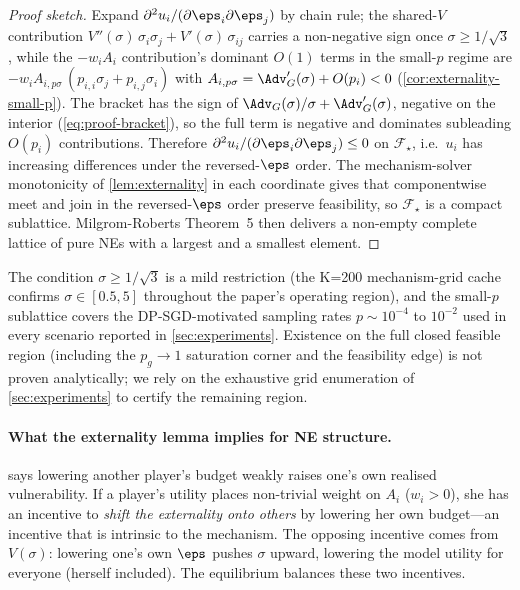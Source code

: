 \begin{proof}[Proof sketch]
Expand $\partial^2 u_i / (\partial \eps_i \partial \eps_j)$ by chain
rule; the shared-$V$ contribution
$V''(\sigma)\,\sigma_i\sigma_j + V'(\sigma)\,\sigma_{ij}$ carries a
non-negative sign once $\sigma \geq 1/\sqrt 3$, while the $-w_i A_i$
contribution's dominant $O(1)$ terms in the small-$p$ regime are
$-w_i A_{i,p\sigma}\,(p_{i,i}\sigma_j + p_{i,j}\sigma_i)$ with
$A_{i,p\sigma} = \Adv_G'(\sigma) + O(p_i) < 0$
(\cref{cor:externality-small-p}). The bracket has the sign of
$\Adv_G(\sigma)/\sigma + \Adv_G'(\sigma)$, negative on the interior
(\eqref{eq:proof-bracket}), so the full term is negative and dominates
subleading $O(p_i)$ contributions. Therefore
$\partial^2 u_i / (\partial \eps_i \partial \eps_j) \leq 0$ on
$\mathcal F_\star$, i.e.\ $u_i$ has increasing differences under the
reversed-$\eps$ order. The mechanism-solver monotonicity of \cref{lem:externality}
in each coordinate gives that componentwise meet and join in the
reversed-$\eps$ order preserve feasibility, so $\mathcal F_\star$ is a
compact sublattice. Milgrom-Roberts Theorem~5
\cite{milgrom1990rationalizability} then delivers a non-empty complete
lattice of pure NEs with a largest and a smallest element.
\end{proof}

The condition $\sigma \geq 1/\sqrt 3$ is a mild restriction (the K=200
mechanism-grid cache confirms $\sigma \in [0.5, 5]$ throughout the
paper's operating region), and the small-$p$ sublattice covers the
DP-SGD-motivated sampling rates $p \sim 10^{-4}$ to $10^{-2}$ used in
every scenario reported in \cref{sec:experiments}. Existence on the
full closed feasible region (including the $p_g \to 1$ saturation corner
and the feasibility edge) is not proven analytically; we rely on the
exhaustive grid enumeration of \cref{sec:experiments} to certify the
remaining region.

\paragraph{What the externality lemma implies for NE structure.}
 says lowering another player's budget weakly
raises one's own realised vulnerability. If a player's utility places
non-trivial weight on $A_i$ ($w_i > 0$), she has an incentive to
\emph{shift the externality onto others} by lowering her own budget---an
incentive that is intrinsic to the mechanism. The opposing incentive comes
from $V(\sigma)$: lowering one's own $\eps$ pushes $\sigma$ upward,
lowering the model utility for everyone (herself included). The
equilibrium balances these two incentives.

